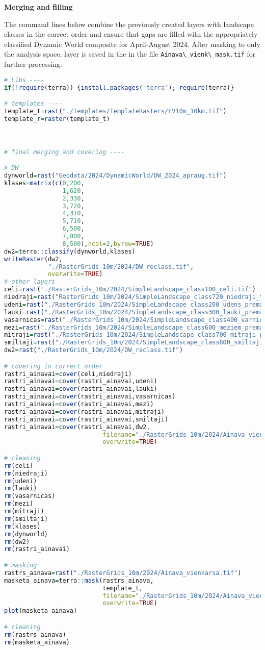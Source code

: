 \documentclass[
]{book}
\newcommand{\passthrough}[1]{#1}
\begin{document}
\textbf{Merging and filling}

The command lines below combine the previously created layers with landscape
classes in the correct order and ensure that gaps are filled with the appropriately
classified Dynamic World composite for April-August 2024. After masking to only
the analysis space, layer is saved in the in the file \passthrough{\lstinline!Ainava\_vienk\_mask.tif!}
for further processing.

\begin{lstlisting}[language=R]
# Libs ----
if(!require(terra)) {install.packages("terra"); require(terra)}

# templates ----
template_t=rast("./Templates/TemplateRasters/LV10m_10km.tif")
template_r=raster(template_t)



# final merging and covering ----

# DW  
dynworld=rast("Geodata/2024/DynamicWorld/DW_2024_apraug.tif")
klases=matrix(c(0,200,
                1,620,
                2,330,
                3,720,
                4,310,
                5,710,
                6,500,
                7,800,
                8,500),ncol=2,byrow=TRUE)
dw2=terra::classify(dynworld,klases)
writeRaster(dw2,
            "./RasterGrids_10m/2024/DW_reclass.tif",
            overwrite=TRUE)
# other layers
celi=rast("./RasterGrids_10m/2024/SimpleLandscape_class100_celi.tif")
niedraji=rast("RasterGrids_10m/2024/SimpleLandscape_class720_niedraji_topo.tif")
udeni=rast("./RasterGrids_10m/2024/SimpleLandscape_class200_udens_premask.tif")
lauki=rast("./RasterGrids_10m/2024/SimpleLandscape_class300_lauki_premask.tif")
vasarnicas=rast("./RasterGrids_10m/2024/SimpleLandscape_class400_varnicas_premask.tif")
mezi=rast("./RasterGrids_10m/2024/SimpleLandscape_class600_meziem_premask.tif")
mitraji=rast("./RasterGrids_10m/2024/SimpleLandscape_class700_mitraji_premask.tif")
smiltaji=rast("./RasterGrids_10m/2024/SimpleLandscape_class800_smiltaji_premask.tif")
dw2=rast("./RasterGrids_10m/2024/DW_reclass.tif")

# covering in correct order
rastri_ainavai=cover(celi,niedraji)
rastri_ainavai=cover(rastri_ainavai,udeni)
rastri_ainavai=cover(rastri_ainavai,lauki)
rastri_ainavai=cover(rastri_ainavai,vasarnicas)
rastri_ainavai=cover(rastri_ainavai,mezi)
rastri_ainavai=cover(rastri_ainavai,mitraji)
rastri_ainavai=cover(rastri_ainavai,smiltaji)
rastri_ainavai=cover(rastri_ainavai,dw2,
                           filename="./RasterGrids_10m/2024/Ainava_vienkarsa.tif",
                           overwrite=TRUE)

# cleaning
rm(celi)
rm(niedraji)
rm(udeni)
rm(lauki)
rm(vasarnicas)
rm(mezi)
rm(mitraji)
rm(smiltaji)
rm(klases)
rm(dynworld)
rm(dw2)
rm(rastri_ainavai)

# masking
rastrs_ainava=rast("./RasterGrids_10m/2024/Ainava_vienkarsa.tif")
masketa_ainava=terra::mask(rastrs_ainava,
                           template_t,
                           filename="./RasterGrids_10m/2024/Ainava_vienk_mask.tif",
                           overwrite=TRUE)
plot(masketa_ainava)

# cleaning
rm(rastrs_ainava)
rm(masketa_ainava)
\end{lstlisting}
\end{document}
